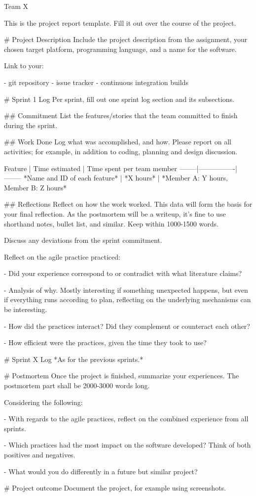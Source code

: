 \documentclass[14]{article}
\begin{document}
  Team X
%

This is the project report template.
Fill it out over the course of the project.

# Project Description
Include the project description from the assignment,
your chosen target platform,
programming language,
and a name for the software.

Link to your:

- git repository
- issue tracker
- continuous integration builds

# Sprint 1 Log
Per sprint, fill out one sprint log section and its subsections.

## Commitment
List the features/stories that the team committed to finish during the sprint.

## Work Done
Log what was accomplished, and how.
Please report on all activities; for example, in addition to coding, planning and design discussion.

Feature | Time estimated | Time spent per team member
--------|----------------|--------
*Name and ID of each feature* | *X hours* | *Member A: Y hours, Member B: Z hours*

## Reflections
Reflect on how the work worked.
This data will form the basis for your final reflection.
As the postmortem will be a writeup, it's fine to use shorthand notes, bullet list, and similar.
Keep within 1000-1500 words.

Discuss any deviations from the sprint commitment.

Reflect on the agile practice practiced:

- Did your experience correspond to or contradict with what literature claims?

    - Analysis of why. Mostly interesting if something unexpected happens, but even
      if everything runs according to plan, reflecting on the underlying mechanisms
      can be interesting.

- How did the practices interact?
  Did they complement or counteract each other?

- How efficient were the practices, given the time they took to use?


# Sprint X Log
*As for the previous sprints.*


# Postmortem
Once the project is finished, summarize your experiences.
The postmortem part shall be 2000-3000 words long.

Considering the following:

- With regards to the agile practices, reflect on the combined experience from all sprints.

- Which practices had the most impact on the software developed?
  Think of both positives and negatives.

- What would you do differently in a future but similar project?


# Project outcome
Document the project, for example using screenshots.
\end{document}
